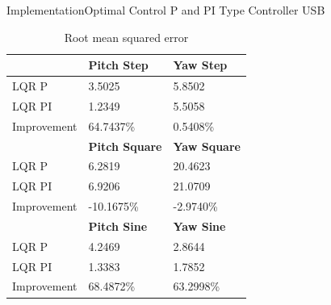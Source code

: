 \documentclass{beamer}
\begin{document}
%
\begin{frame}{Implementation}{Optimal Control P and PI Type Controller USB}
\begin{table}
    \centering
    \begin{tabular}{l|l|l}
        \toprule
        \textbf{} & \textbf{Pitch Step} & \textbf{Yaw Step}\\
        \toprule
        LQR P & 3.5025 & 5.8502\\
        LQR PI & 1.2349 & 5.5058\\
        Improvement & 64.7437\% & 0.5408\% \\
        \toprule
        \textbf{} & \textbf{Pitch Square} & \textbf{Yaw Square}\\
        \toprule
        LQR P & 6.2819 & 20.4623\\
        LQR PI & 6.9206 & 21.0709\\
        Improvement & -10.1675\% & -2.9740\% \\
        \toprule
        \textbf{} & \textbf{Pitch Sine} & \textbf{Yaw Sine}\\
        \toprule
        LQR P & 4.2469 & 2.8644\\
        LQR PI & 1.3383 & 1.7852\\
        Improvement & 68.4872\% & 63.2998\% \\
    \end{tabular}
    \caption{Root mean squared error}
    \label{tab:RMSE}
\end{table}
\end{frame}
\end{document}
